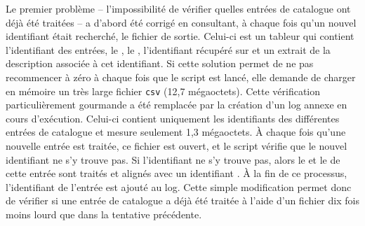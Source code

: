 Le premier problème -- l'impossibilité de vérifier quelles entrées de catalogue ont déjà été traitées -- a d'abord été corrigé en consultant, à chaque fois qu'un nouvel identifiant était recherché, le fichier de sortie. Celui-ci est un tableur qui contient l'identifiant des entrées, le \tname{}, le \ttrait{}, l'identifiant récupéré sur \wkd{} et un extrait de la description associée à cet identifiant. Si cette solution permet de ne pas recommencer à zéro à chaque fois que le script est lancé, elle demande de charger en mémoire un très large fichier \texttt{csv} (12,7 mégaoctets). Cette vérification particulièrement gourmande a été remplacée par la création d'un \gls{log} annexe en cours d'exécution. Celui-ci contient uniquement les identifiants des différentes entrées de catalogue et mesure seulement 1,3 mégaoctets. À chaque fois qu'une nouvelle entrée est traitée, ce fichier est ouvert, et le script vérifie que le nouvel identifiant ne s'y trouve pas. Si l'identifiant ne s'y trouve pas, alors le \tname{} et le \ttrait{} de cette entrée sont traités et alignés avec un identifiant \wkd{}. À la fin de ce processus, l'identifiant \tei{} de l'entrée est ajouté au \gls{log}. Cette simple modification permet donc de vérifier si une entrée de catalogue a déjà été traitée à l'aide d'un fichier dix fois moins lourd que dans la tentative précédente.

